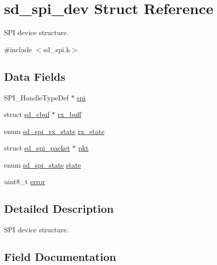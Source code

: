 \hypertarget{structsd__spi__dev}{}\section{sd\+\_\+spi\+\_\+dev Struct Reference}
\label{structsd__spi__dev}


S\+PI device structure.  




{\ttfamily \#include $<$sd\+\_\+spi.\+h$>$}

\subsection*{Data Fields}
\begin{DoxyCompactItemize}
\item 
S\+P\+I\+\_\+\+Handle\+Type\+Def $\ast$ \mbox{\hyperlink{structsd__spi__dev_a06909907ded69cbc00db1f401a90f8ee}{spi}}
\item 
struct \mbox{\hyperlink{structsd__cbuf}{sd\+\_\+cbuf}} $\ast$ \mbox{\hyperlink{structsd__spi__dev_a2bc17c33f4234299b83ba5d98edd5887}{rx\+\_\+buff}}
\item 
enum \mbox{\hyperlink{group___s_d___s_p_i___types_ga0cf86b44c1bee9173f49395d05e076d5}{sd\+\_\+spi\+\_\+rx\+\_\+state}} \mbox{\hyperlink{structsd__spi__dev_a7488772254dfa2b24612698ff20d2db5}{rx\+\_\+state}}
\item 
struct \mbox{\hyperlink{structsd__spi__packet}{sd\+\_\+spi\+\_\+packet}} $\ast$ \mbox{\hyperlink{structsd__spi__dev_a1dcf429d8ce65a6c37d9e20c41143afe}{pkt}}
\item 
enum \mbox{\hyperlink{group___s_d___s_p_i___types_gaf0ec45d302a4c5a4af552acb7a001fa1}{sd\+\_\+spi\+\_\+state}} \mbox{\hyperlink{structsd__spi__dev_aa9221437053c4de17edc36917e4afda2}{state}}
\item 
uint8\+\_\+t \mbox{\hyperlink{structsd__spi__dev_adc64ccb7538429fe78e3fe0139267370}{error}}
\end{DoxyCompactItemize}


\subsection{Detailed Description}
S\+PI device structure. 

\subsection{Field Documentation}
\mbox{\label{structsd__spi__dev_adc64ccb7538429fe78e3fe0139267370}} 
